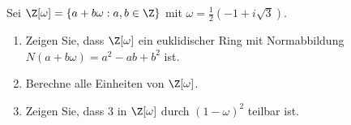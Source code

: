 
\begin{exercise}

Sei $\Z[\omega] = \{a + b\omega: a, b \in \Z\}$ mit $\omega = \frac{1}{2}(-1 + i\sqrt{3})$.

\begin{enumerate}[label = (\alph*)]
    \item Zeigen Sie, dass $\Z[\omega]$ ein euklidischer Ring mit Normabbildung $N(a + b\omega) = a^2 - ab + b^2$ ist.
    \item Berechne alle Einheiten von $\Z[\omega]$.
    \item Zeigen Sie, dass 3 in $\Z[\omega]$ durch $(1 - \omega)^2$ teilbar ist.
\end{enumerate}

\end{exercise}


\begin{solution}

\phantom{}

\end{solution}

